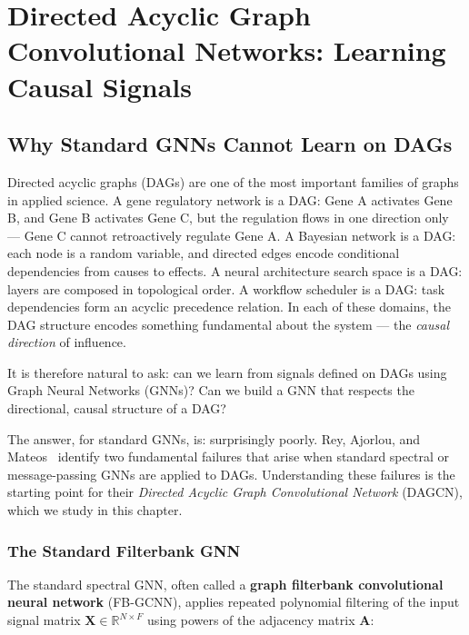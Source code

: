\chapter{Directed Acyclic Graph Convolutional Networks: Learning Causal Signals}
\label{chap:rey_dagcn}

\section{Why Standard GNNs Cannot Learn on DAGs}
\label{sec:dagcn_motivation}

Directed acyclic graphs (DAGs) are one of the most important families of graphs
in applied science. A gene regulatory network is a DAG: Gene A activates Gene
B, and Gene B activates Gene C, but the regulation flows in one direction only
--- Gene C cannot retroactively regulate Gene A. A Bayesian network is a DAG:
each node is a random variable, and directed edges encode conditional
dependencies from causes to effects. A neural architecture search space is a
DAG: layers are composed in topological order. A workflow scheduler is a DAG:
task dependencies form an acyclic precedence relation. In each of these domains,
the DAG structure encodes something fundamental about the system --- the
\emph{causal direction} of influence.

It is therefore natural to ask: can we learn from signals defined on DAGs using
Graph Neural Networks (GNNs)? Can we build a GNN that respects the directional,
causal structure of a DAG?

The answer, for standard GNNs, is: surprisingly poorly. Rey, Ajorlou, and
Mateos~\cite{rey2025dagcn} identify two fundamental failures that arise when
standard spectral or message-passing GNNs are applied to DAGs. Understanding
these failures is the starting point for their \emph{Directed Acyclic Graph
Convolutional Network} (DAGCN), which we study in this chapter.

\subsection{The Standard Filterbank GNN}

The standard spectral GNN, often called a \textbf{graph filterbank convolutional
neural network} (FB-GCNN), applies repeated polynomial filtering of the input
signal matrix $\mathbf{X} \in \mathbb{R}^{N \times F}$ using powers of the
adjacency matrix $\mathbf{A}$:


